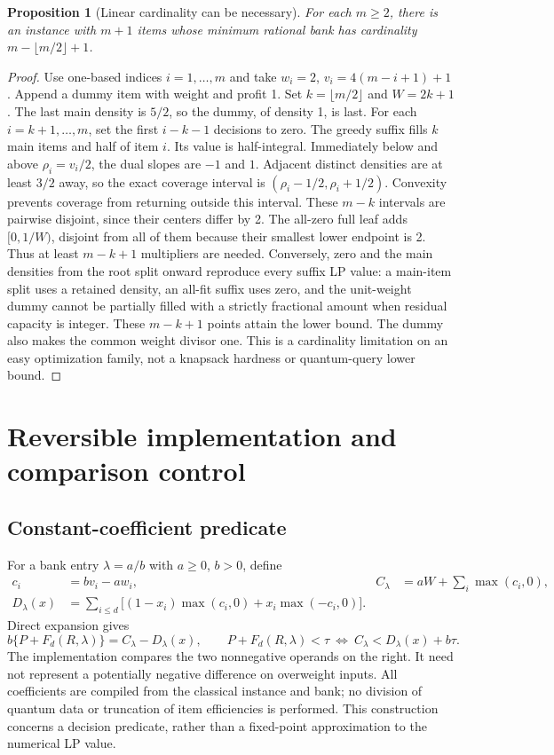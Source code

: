 \documentclass[referee,pdflatex,sn-mathphys-num]{sn-jnl}
\theoremstyle{thmstyleone}
\newtheorem{proposition}[theorem]{Proposition}
\theoremstyle{thmstyletwo}
\begin{document}
\begin{proposition}[Linear cardinality can be necessary]\label{prop:barrier}
For each $m\geq2$, there is an instance with $m+1$ items whose minimum rational bank has cardinality $m-\lfloor m/2\rfloor+1$.
\end{proposition}
\begin{proof}
Use one-based indices $i=1,\ldots,m$ and take $w_i=2$, $v_i=4(m-i+1)+1$. Append a dummy item with weight and profit 1. Set $k=\lfloor m/2\rfloor$ and $W=2k+1$. The last main density is $5/2$, so the dummy, of density 1, is last. For each $i=k+1,\ldots,m$, set the first $i-k-1$ decisions to zero. The greedy suffix fills $k$ main items and half of item $i$. Its value is half-integral. Immediately below and above $\rho_i=v_i/2$, the dual slopes are $-1$ and $1$. Adjacent distinct densities are at least $3/2$ away, so the exact coverage interval is $(\rho_i-1/2,\rho_i+1/2)$. Convexity prevents coverage from returning outside this interval. These $m-k$ intervals are pairwise disjoint, since their centers differ by 2. The all-zero full leaf adds $[0,1/W)$, disjoint from all of them because their smallest lower endpoint is 2. Thus at least $m-k+1$ multipliers are needed. Conversely, zero and the main densities from the root split onward reproduce every suffix LP value: a main-item split uses a retained density, an all-fit suffix uses zero, and the unit-weight dummy cannot be partially filled with a strictly fractional amount when residual capacity is integer. These $m-k+1$ points attain the lower bound. The dummy also makes the common weight divisor one. This is a cardinality limitation on an easy optimization family, not a knapsack hardness or quantum-query lower bound.
\end{proof}


\section{Reversible implementation and comparison control}\label{sec:circuit}
\subsection{Constant-coefficient predicate}
For a bank entry $\lambda=a/b$ with $a\geq0$, $b>0$, define
\begin{align}
 c_i&=bv_i-aw_i,& C_\lambda&=aW+\sum_i\max(c_i,0),\\
 D_\lambda(x)&=\sum_{i\leq d}\bigl[(1-x_i)\max(c_i,0)+x_i\max(-c_i,0)\bigr].\label{eq:loss}
\end{align}
Direct expansion gives
\begin{equation}\label{eq:integercompare}
 b\{P+F_d(R,\lambda)\}=C_\lambda-D_\lambda(x),\qquad
 P+F_d(R,\lambda)<\tau\ \Longleftrightarrow\ C_\lambda<D_\lambda(x)+b\tau.
\end{equation}
The implementation compares the two nonnegative operands on the right. It need not represent a potentially negative difference on overweight inputs. All coefficients are compiled from the classical instance and bank; no division of quantum data or truncation of item efficiencies is performed. This construction concerns a decision predicate, rather than a fixed-point approximation to the numerical LP value.
\end{document}

